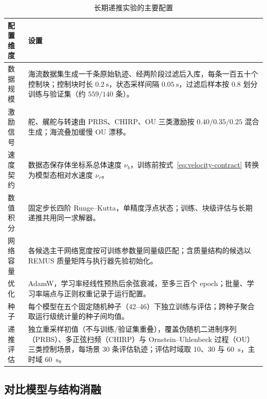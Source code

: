 \begin{table}[htbp]
  \centering
  \caption{长期递推实验的主要配置}
  \label{tab:experimental-config}
  \begin{tabularx}{\textwidth}{>{\raggedright\arraybackslash}p{}>{\raggedright\arraybackslash}X}
    \toprule
    配置维度 & 设置 \\
    \midrule
    数据规模 & 海流数据集生成一千条原始轨迹、经两阶段过滤后入库，每条一百五十个控制块；控制块时长 \(0.2~\mathrm{s}\)，状态采样间隔 \(0.05~\mathrm{s}\)，过滤后样本按 \(0.8\) 划分训练与验证集（约 \(559/140\) 条）。 \\
    激励信号 & 舵、艉舵与转速由 PRBS、CHIRP、OU 三类激励按 \(0.40/0.35/0.25\) 混合生成；海流叠加缓慢 OU 漂移。 \\
    速度契约 & 数据态保存体坐标系总体速度 \(\nu_b\)，训练前按式~\eqref{eq:velocity-contract} 转换为模型态相对水速度 \(\nu_r\)。 \\
    数值积分 & 固定步长四阶 Runge--Kutta，单精度浮点状态；训练、块级评估与长期递推共用同一求解器。 \\
    网络容量 & 各候选主干网络宽度按可训练参数量同量级匹配；含质量结构的候选以 REMUS 质量矩阵与执行器先验初始化。 \\
    优化 & AdamW，学习率经线性预热后余弦衰减，至多三百个 epoch；批量、学习率端点与正则权重记录于运行配置。 \\
    种子 & 每个模型在五个固定随机种子（42--46）下独立训练与评估；跨种子聚合取运行级统计量的种子间均值。 \\
    递推评估 & 独立重采样初值（不与训练/验证集重叠），覆盖伪随机二进制序列（PRBS）、多正弦扫频（CHIRP）与 Ornstein--Uhlenbeck 过程（OU）三类控制场景，每场景 30 条评估轨迹；评估时域取 10、30 与 60~\(\mathrm{s}\)，主时域 60~\(\mathrm{s}\)。 \\
    \bottomrule
  \end{tabularx}
\end{table}

\subsection{对比模型与结构消融}
\label{subsec:models-ablations}

